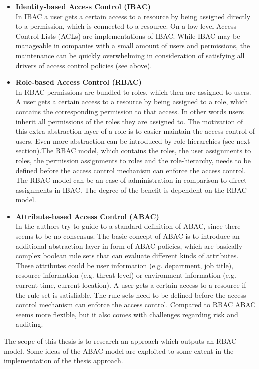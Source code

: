     \begin{itemize}
        \iffalse \item \textbf{Discretionary Access Control (DAC)}\\\fi
        \item \textbf{Identity-based Access Control (IBAC)}\\
        In IBAC a user gets a certain access to a resource by being assigned directly to a permission, which is connected to a resource. On a low-level Access Control Lists (ACLs) are implementations of IBAC. While IBAC may be manageable in companies with a small amount of users and permissions, the maintenance can be quickly overwhelming in consideration of satisfying all drivers of access control policies (see above).
        \item \textbf{Role-based Access Control (RBAC)}\\
        In RBAC permissions are bundled to roles, which then are assigned to users. A user gets a certain access to a resource by being assigned to a role, which contains the corresponding permission to that access. In other words users inherit all permissions of the roles they are assigned to. The motivation of this extra abstraction layer of a role is to easier maintain the access control of users.
        Even more abstraction can be introduced by role hierarchies (see next section).\iffalse , where a role inherits all permissions of its parent-role.\fi The RBAC model, which contains the roles, the user assignments to roles, the permission assignments to roles and the role-hierarchy, needs to be defined before the access control mechanism can enforce the access control. The RBAC model can be an ease of administration in comparison to direct assignments in IBAC. The degree of the benefit is dependent on the RBAC model.
        \item \textbf{Attribute-based Access Control (ABAC)}\\
        In \cite{Hu13guideto} the authors try to guide to a standard definition of ABAC, since there seems to be no consensus. The basic concept of ABAC is to introduce an additional abstraction layer in form of ABAC policies, which are basically complex boolean rule sets that can evaluate different kinds of attributes. These attributes could be user information (e.g. department, job title), resource information (e.g. threat level) or environment information (e.g. current time, current location). A user gets a certain access to a resource if the rule set is satisfiable. The rule sets need to be defined before the access control mechanism can enforce the access control. Compared to RBAC ABAC seems more flexible, but it also comes with challenges regarding risk and auditing\cite{Coyne:2013}.
    \end{itemize}
    The scope of this thesis is to research an approach which outputs an RBAC model. Some ideas of the ABAC model are exploited to some extent in the implementation of the thesis approach.\\
    
